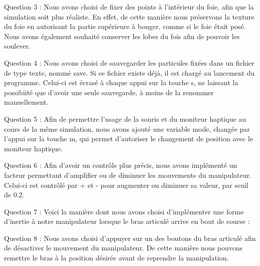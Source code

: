 \documentclass[a4paper,12pt]{article}
\begin{document}
Question 3 : Nous avons choisi de fixer des points à l'intérieur du foie, afin que la simulation soit plus réaliste. En effet, de cette manière nous préservons la \og{}texture\fg{} du foie en autorisant la partie supérieure à bouger, comme si le foie était posé. Nous avons également souhaité conserver les lobes du fois afin de pouvoir les soulever.

Question 4 : Nous avons choisi de sauvegarder les particules fixées dans un fichier de type texte, nommé \og{}save\fg{}. Si ce fichier existe déjà, il est chargé au lancement du programme. Celui-ci est écrasé à chaque appui sur la touche \og{}s\fg{}, ne laissant la possibiité que d'avoir une seule sauvegarde, à moins de la renommer manuellement.

Question 5 : Afin de permettre l'usage de la souris et du moniteur haptique au cours de la même simulation, nous avons ajouté une variable \og{}mode\fg{}, changée par l'appui sur la touche \og{}m\fg{}, qui permet d'autoriser le changement de position avec le moniteur haptique.

Question 6 : Afin d'avoir un contrôle plus précis, nous avons implémenté un facteur permettant d'amplifier ou de diminuer les mouvements du manipulateur. Celui-ci est contrôlé par \og{}+\fg{} et \og{}-\fg{} pour augmenter ou diminuer sa valeur, par seuil de 0.2.

Question 7 : Voici la manière dont nous avons choisi d'implémenter une forme d'inertie à notre manipulateur lorsque le bras articulé arrive en bout de course :

Question 8 : Nous avons choisi d'appuyer sur un des boutons du bras articulé afin de désactiver le mouvement du manipulateur. De cette manière nous pouvons remettre le bras à la position désirée avant de reprendre la manipulation.
\end{document}
